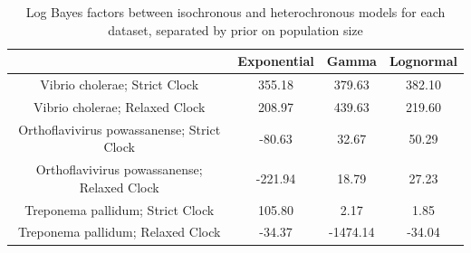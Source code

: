 \documentclass[11pt]{article}
\begin{document}
\begin{itemize}
\begin{center}
        \end{center}
        \begin{table}[H]
        \caption{Log Bayes factors between isochronous and heterochronous models for each dataset, separated by prior on population size}
        \begin{center}
        \begin{tabular}{ c | c c c }
         & Exponential & Gamma & Lognormal \\ 
        \hline
        Vibrio cholerae; Strict Clock & 355.18 & 379.63 & 382.10 \\  
        Vibrio cholerae; Relaxed Clock & 208.97 & 439.63 & 219.60 \\   
        Orthoflavivirus powassanense; Strict Clock & -80.63 & 32.67 & 50.29 \\  
        Orthoflavivirus powassanense; Relaxed Clock & -221.94 & 18.79  & 27.23 \\   
        Treponema pallidum; Strict Clock & 105.80 & 2.17 & 1.85 \\  
        Treponema pallidum; Relaxed Clock & -34.37 & -1474.14 & -34.04
        \end{tabular}
        \end{center}
        \end{table}
    

\end{itemize}
\end{document}
